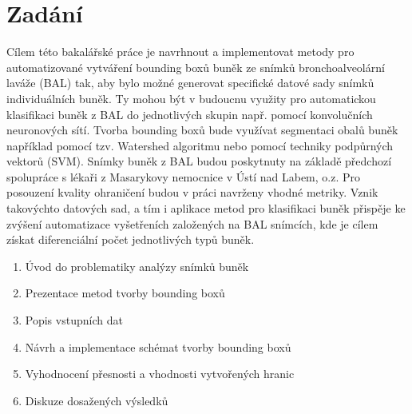 \documentclass{article}
\begin{document}
\section{Zadání}

Cílem této bakalářské práce je navrhnout a implementovat metody pro automatizované vytváření bounding boxů buněk ze snímků bronchoalveolární laváže (BAL) tak, aby bylo možné generovat specifické datové sady snímků individuálních buněk. Ty mohou být v budoucnu využity pro automatickou klasifikaci buněk z BAL do jednotlivých skupin např. pomocí konvolučních neuronových sítí. Tvorba bounding boxů bude využívat segmentaci obalů buněk například pomocí tzv. Watershed algoritmu nebo pomocí techniky podpůrných vektorů (SVM). Snímky buněk z BAL budou poskytnuty na základě předchozí spolupráce s lékaři z Masarykovy nemocnice v Ústí nad Labem, o.z. Pro posouzení kvality ohraničení budou v práci navrženy vhodné metriky. Vznik takovýchto datových sad, a tím i aplikace metod pro klasifikaci buněk přispěje ke zvýšení automatizace vyšetřeních založených na BAL snímcích, kde je cílem získat diferenciální počet jednotlivých typů buněk.


\begin{enumerate}
    \item Úvod do problematiky analýzy snímků buněk
    \item Prezentace metod tvorby bounding boxů
    \item Popis vstupních dat
    \item Návrh a implementace schémat tvorby bounding boxů
    \item Vyhodnocení přesnosti a vhodnosti vytvořených hranic
    \item Diskuze dosažených výsledků
\end{enumerate}
\end{document}
